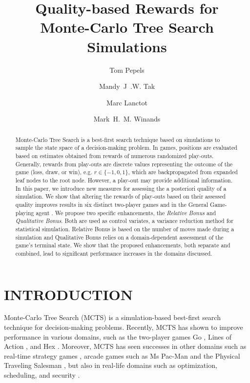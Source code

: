 \documentclass{ecai2014}
\begin{document}
\title{Quality-based Rewards for \\ Monte-Carlo Tree Search Simulations}

\author{Tom Pepels \and Mandy~J~.W. Tak \and Marc Lanctot \and Mark~H.~M. Winands }

\maketitle


\begin{abstract}
Monte-Carlo Tree Search is a best-first search technique based on simulations to sample the state space of a decision-making problem. In games, positions are evaluated based on estimates obtained from rewards of numerous randomized play-outs. Generally, rewards from play-outs are discrete values representing the outcome of the game (loss, draw, or win), e.g. $r \in \{-1, 0, 1\}$, which are backpropagated from expanded leaf nodes to the root node. However, a play-out may provide additional information. In this paper, we introduce new measures for assessing the a posteriori quality of a simulation. We show that altering the rewards of play-outs based on their assessed quality improves results in six distinct two-player games and in the General Game-playing agent {}. We propose two specific enhancements, the \emph{Relative Bonus} and \emph{Qualitative Bonus}. Both are used as control variates, a variance reduction method for statistical simulation. Relative Bonus is based on the number of moves made during a simulation and Qualitative Bonus relies on a domain-dependent assessment of the game's terminal state. We show that the proposed enhancements, both separate and combined, lead to significant performance increases in the domains discussed.
\end{abstract}

\section{INTRODUCTION}
\label{sec:intro}
Monte-Carlo Tree Search (MCTS) \cite{coulom2007efficient,kocsis2006bandit} is a simulation-based best-first search technique for decision-making problems. Recently, MCTS has shown to improve performance in various domains, such as the two-player games Go \cite{lee2010current}, Lines of Action \cite{Winands2010b}, and Hex \cite{arneson2010monte}. Moreover, MCTS has seen successes in other domains such as real-time strategy games \cite{browne2012survey}, arcade games such as Ms Pac-Man \cite{enhancementspacmancig12} and the Physical Traveling Salesman \cite{powleytsp}, but also in real-life domains such as optimization, scheduling, and security \cite{browne2012survey}.
\end{document}
